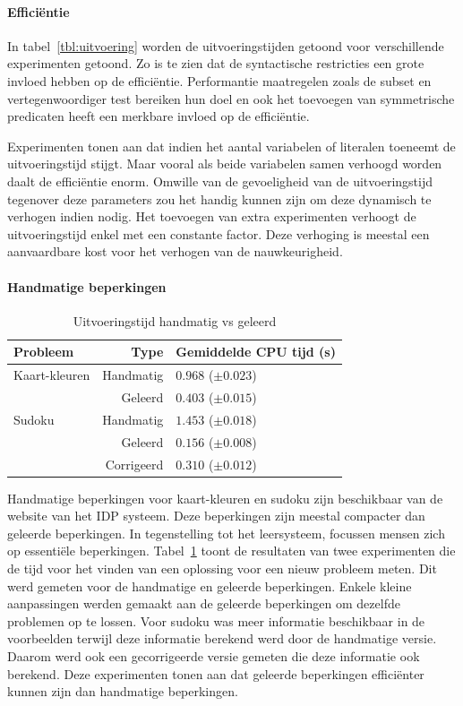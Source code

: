 \documentclass{llncs}
\begin{document}
\paragraph{Effici\"entie}
In tabel~\ref{tbl:uitvoering} worden de uitvoeringstijden getoond voor verschillende experimenten getoond.
Zo is te zien dat de syntactische restricties een grote invloed hebben op de effici\"entie.
Performantie maatregelen zoals de subset en vertegenwoordiger test bereiken hun doel en ook het toevoegen van symmetrische predicaten heeft een merkbare invloed op de effici\"entie.

Experimenten tonen aan dat indien het aantal variabelen of literalen toeneemt de uitvoeringstijd stijgt.
Maar vooral als beide variabelen samen verhoogd worden daalt de effici\"entie enorm.
Omwille van de gevoeligheid van de uitvoeringstijd tegenover deze parameters zou het handig kunnen zijn om deze dynamisch te verhogen indien nodig.
Het toevoegen van extra experimenten verhoogt de uitvoeringstijd enkel met een constante factor.
Deze verhoging is meestal een aanvaardbare kost voor het verhogen van de nauwkeurigheid.

\paragraph{Handmatige beperkingen}
  \begin{table}[!htp]
    \caption{Uitvoeringstijd handmatig vs geleerd}
    \begin{tabularx}{\linewidth}{lr|X}
      \textbf{Probleem} & \textbf{Type} & \textbf{Gemiddelde CPU tijd (s)} \\
      \toprule
      Kaart-kleuren & Handmatig & $0.968$  ($\pm 0.023$) \\
      & Geleerd & $0.403$       ($\pm 0.015$) \\
      \midrule
      Sudoku & Handmatig & $1.453$    ($\pm 0.018$) \\ 
      & Geleerd & $0.156$       ($\pm 0.008$) \\
      & Corrigeerd & $0.310$       ($\pm 0.012$)
    \end{tabularx}
    \label{tbl:mens}
  \end{table}
Handmatige beperkingen voor kaart-kleuren en sudoku zijn beschikbaar van de website van het IDP systeem.
Deze beperkingen zijn meestal compacter dan geleerde beperkingen.
In tegenstelling tot het leersysteem, focussen mensen zich op essenti\"ele beperkingen.
Tabel~\ref{tbl:mens} toont de resultaten van twee experimenten die de tijd voor het vinden van een oplossing voor een nieuw probleem meten.
Dit werd gemeten voor de handmatige en geleerde beperkingen.
Enkele kleine aanpassingen werden gemaakt aan de geleerde beperkingen om dezelfde problemen op te lossen.
Voor sudoku was meer informatie beschikbaar in de voorbeelden terwijl deze informatie berekend werd door de handmatige versie.
Daarom werd ook een gecorrigeerde versie gemeten die deze informatie ook berekend.
Deze experimenten tonen aan dat geleerde beperkingen effici\"enter kunnen zijn dan handmatige beperkingen.
\end{document}
